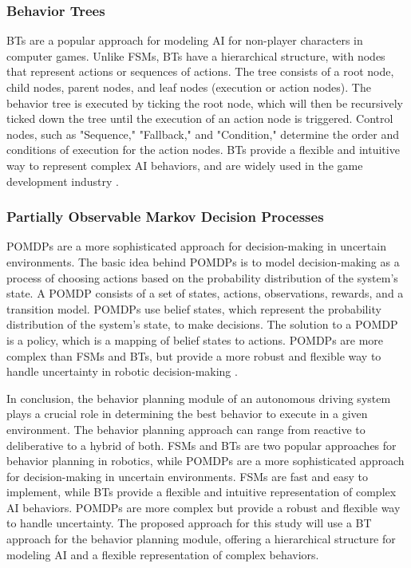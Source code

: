 \documentclass[letterpaper, 10pt, conference]{ieeeconf}
\begin{document}
\subsubsection{Behavior Trees}

BTs are a popular approach for modeling AI for non-player characters in computer games. Unlike FSMs, BTs have a hierarchical structure, with nodes that represent actions or sequences of actions. The tree consists of a root node, child nodes, parent nodes, and leaf nodes (execution or action nodes). The behavior tree is executed by ticking the root node, which will then be recursively ticked down the tree until the execution of an action node is triggered. Control nodes, such as "Sequence," "Fallback," and "Condition," determine the order and conditions of execution for the action nodes. BTs provide a flexible and intuitive way to represent complex AI behaviors, and are widely used in the game development industry \cite{iovino2022}.

\subsubsection{Partially Observable Markov Decision Processes}

POMDPs are a more sophisticated approach for decision-making in uncertain environments. The basic idea behind POMDPs is to model decision-making as a process of choosing actions based on the probability distribution of the system's state. A POMDP consists of a set of states, actions, observations, rewards, and a transition model. POMDPs use belief states, which represent the probability distribution of the system's state, to make decisions. The solution to a POMDP is a policy, which is a mapping of belief states to actions. POMDPs are more complex than FSMs and BTs, but provide a more robust and flexible way to handle uncertainty in robotic decision-making \cite{feyzabadi2014riskaware}.

In conclusion, the behavior planning module of an autonomous driving system plays a crucial role in determining the best behavior to execute in a given environment. The behavior planning approach can range from reactive to deliberative to a hybrid of both. FSMs and BTs are two popular approaches for behavior planning in robotics, while POMDPs are a more sophisticated approach for decision-making in uncertain environments. FSMs are fast and easy to implement, while BTs provide a flexible and intuitive representation of complex AI behaviors. POMDPs are more complex but provide a robust and flexible way to handle uncertainty. The proposed approach for this study will use a BT approach for the behavior planning module, offering a hierarchical structure for modeling AI and a flexible representation of complex behaviors.
\end{document}
